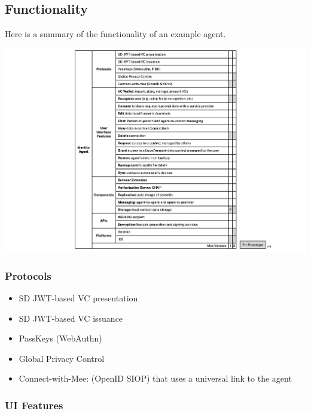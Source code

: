 \documentclass[11pt, oneside]{article}   	%
\begin{document}
\subsection{Functionality}

Here is a summary of the functionality of an example agent.

\includegraphics[width=\textwidth]{./images/agent-functionality.png}

\subsubsection{Protocols}

\begin{itemize}
\item SD JWT-based VC presentation
\item SD JWT-based VC issuance
\item PassKeys (WebAuthn)
\item Global Privacy Control
\item Connect-with-Mee: (OpenID SIOP) that uses a universal link to the agent
\end{itemize}

\subsubsection{UI Features}
\end{document}
